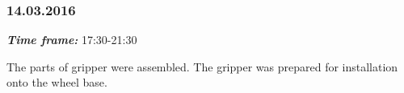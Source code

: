 \subsubsection{14.03.2016}
\textit{\textbf{Time frame:}} 17:30-21:30 

The parts of gripper were assembled. The gripper was prepared for installation onto the wheel base.

